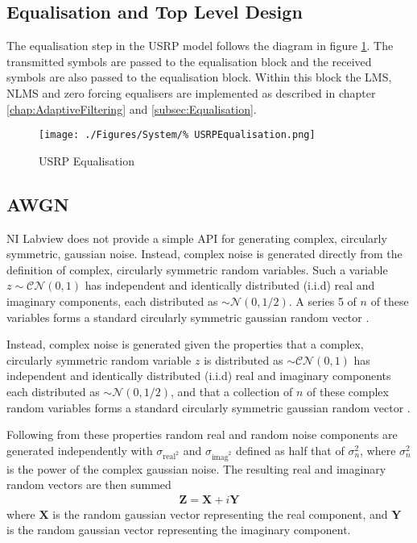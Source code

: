 \subsection{Equalisation and Top Level Design}
The equalisation step in the USRP model follows %
the diagram in figure \ref{fig:USRPEqualisation}. The transmitted %
symbols are passed to the equalisation block and the received %
symbols are also passed to the equalisation block. Within this block %
the LMS, NLMS and zero forcing equalisers are implemented as %
described in chapter \ref{chap:AdaptiveFiltering} and %
\ref{subsec:Equalisation}.
\begin{figure}[ht]
	\centering
	\texttt{[image: ./Figures/System/\%
	USRPEqualisation.png]}
	\caption{USRP Equalisation}
	\label{fig:USRPEqualisation}
\end{figure}
\subsection{AWGN}
NI Labview does not provide a simple API for generating %
complex, circularly symmetric, gaussian noise. Instead, complex %
noise is generated directly from the definition of complex, circularly %
symmetric random variables. Such a variable $z \sim \mathcal{CN}(0,1)$ %
has independent and identically distributed (i.i.d) real and imaginary %
components, each distributed as $\sim \mathcal{N}(0,1/2)$. A series 5
of $n$ of these variables forms a standard circularly symmetric %
gaussian random vector \cite{Tse05}.

Instead, %
complex noise is generated given the properties that %
a complex, circularly symmetric random variable $z$ is %
distributed as $\sim\mathcal{CN}(0,1)$ has independent %
and identically distributed (i.i.d) real and imaginary %
components each distributed as $\sim\mathcal{N}(0,1/2)$, %
and that a collection of $n$ of these complex random %
variables forms a standard circularly symmetric %
gaussian random vector \cite{Tse05}.

Following from these properties random real and %
random noise components are generated independently %
with $\sigma_{\text{real}^{2}}$ and $\sigma_{\text{imag}^{2}}$ %
defined as half that of $\sigma_{n}^{2}$, where $\sigma_{n}^{2}$ %
is the power of the complex gaussian noise. The resulting %
real and imaginary random vectors are then summed
\begin{align}
	\mathbf{Z} = \mathbf{X} + i\mathbf{Y}
\end{align}
where $\mathbf{X}$ is the random gaussian vector %
representing the real component, and $\mathbf{Y}$ %
is the random gaussian vector representing the %
imaginary component.

